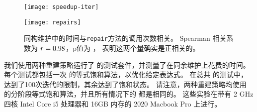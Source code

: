 \begin{figure}
  \begin{minipage}[t]{0.48\linewidth}
  \texttt{[image: speedup-iter]}
  \caption{
    当应用更多重写时，推迟重建会带来更大的加速。
    每条线表示一个测试：
      每次等式饱和迭代绘制目前已经应用的累计重写与推迟重建的乘法加速率; 
      点表示该测试结束。
    整个测试套件（点）和单独的测试（线）均表明随着问题规模的增大而增加的渐近加速。
  }
  \label{fig:eval-iter}
  \end{minipage}
  \hfill
  \begin{minipage}[t]{0.48\linewidth}
  \texttt{[image: repairs]}
  \caption{
    同构维护中的时间与\texttt{repair}方法的调用次数相关。
    Spearman 相关系数为 $r=0.98$，p值为 \RepairsP，
      表明这两个量确实是正相关的。
  }
  \label{fig:repair-plot}
  \end{minipage}
\end{figure}


我们使用两种重建策略运行了 \egg 的测试套件，并测量了在同余维护上花费的时间。
每个测试都包括一次 \egg 的等式饱和算法，以优化给定表达式。
在总共 \nEggTests 的测试中，
\nEggTimeouts 达到了100次迭代的限制，其余达到了饱和状态。
请注意，两种重建策略均使用 \egg 的分阶段等式饱和算法，并且所有情况下的 \egraphs 都是相同的。
这些实验在带有 2 GHz 四核 Intel Core i5 处理器和 16GB 内存的 2020 Macbook Pro 上进行。

